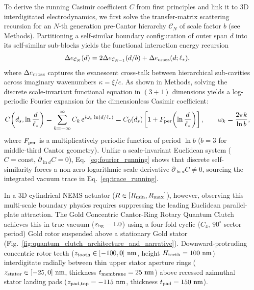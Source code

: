 \documentclass[11pt,letterpaper]{article}
\begin{document}
To derive the running Casimir coefficient $C$ from first principles and link it to 3D interdigitated electrodynamics, we first solve the transfer-matrix scattering recursion for an $N$-th generation pre-Cantor hierarchy $\mathcal{C}_N$ of scale factor $b$ (see Methods). Partitioning a self-similar boundary configuration of outer span $d$ into its self-similar sub-blocks yields the functional interaction energy recursion
\begin{equation}
\Delta e_{\mathcal{C}_N}(d) = 2 \Delta e_{\mathcal{C}_{N-1}}(d/b) + \Delta e_{\rm cross}(d; \ell_*),
\label{eq:recursion_main}
\end{equation}
where $\Delta e_{\rm cross}$ captures the evanescent cross-talk between hierarchical sub-cavities across imaginary wavenumbers $\kappa = \xi/c$. As shown in Methods, solving the discrete scale-invariant functional equation in $(3+1)$ dimensions yields a log-periodic Fourier expansion for the dimensionless Casimir coefficient:
\begin{equation}
C\!\left(d_s, \ln\frac{d}{\ell_*}\right) = \sum_{k=-\infty}^{\infty} C_k \, e^{i \omega_k \ln(d/\ell_*)} = C_0(d_s) \left[ 1 + F_{\rm per}\!\left(\ln\frac{d}{\ell_*}\right) \right], \qquad \omega_k = \frac{2\pi k}{\ln b},
\label{eq:fourier_running}
\end{equation}
where $F_{\rm per}$ is a multiplicatively periodic function of period $\ln b$ ($b=3$ for middle-third Cantor geometry). Unlike a scale-invariant Euclidean system ($C = \text{const}$, $\partial_{\ln d} C = 0$), Eq.~\eqref{eq:fourier_running} shows that discrete self-similarity forces a non-zero logarithmic scale derivative $\partial_{\ln d} C \neq 0$, sourcing the integrated vacuum trace in Eq.~\eqref{eq:trace_running}.

In a 3D cylindrical NEMS actuator ($R \in [R_{\rm min}, R_{\rm max}]$), however, observing this multi-scale boundary physics requires suppressing the leading Euclidean parallel-plate attraction. The Gold Concentric Cantor-Ring Rotary Quantum Clutch achieves this in true vacuum ($\varepsilon_{\rm bg}=1.0$) using a four-fold cyclic ($C_4$, $90^\circ$ sector period) Gold rotor suspended above a stationary Gold stator (Fig.~\ref{fig:quantum_clutch_architecture_and_narrative}). Downward-protruding concentric rotor teeth ($z_{\rm tooth} \in [-100, 0]\text{ nm}$, height $H_{\rm teeth} = 100\text{ nm}$) interdigitate radially between thin upper stator aperture rings ($z_{\rm stator} \in [-25, 0]\text{ nm}$, thickness $t_{\rm membrane} = 25\text{ nm}$) above recessed azimuthal stator landing pads ($z_{\rm pad,top} = -115\text{ nm}$, thickness $t_{\rm pad} = 150\text{ nm}$).
\end{document}
